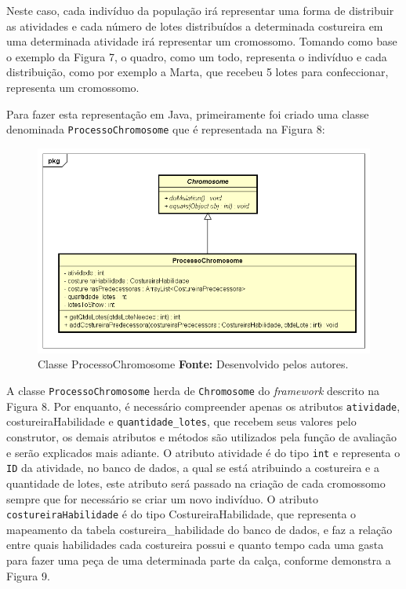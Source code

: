 \par Neste caso, cada indivíduo da população irá representar uma forma de
distribuir as atividades e cada número de lotes distribuídos a determinada
costureira em uma determinada atividade irá representar um cromossomo. 
Tomando como base o exemplo da Figura 7, o quadro, como um todo, representa 
o indivíduo e cada distribuição, como por exemplo a Marta, que recebeu 5 
lotes para confeccionar, representa um cromossomo.

\par Para fazer esta representação em Java, primeiramente foi criado uma classe denominada \texttt{ProcessoChromosome} que é
representada na Figura 8:

\begin{figure}[h!]
	\centerline{\includegraphics[scale=0.6]{./imagens/processo_chromosome_diagram.png}}
	\caption[Classe ProcessoChromosome]
	{Classe ProcessoChromosome \textbf{Fonte:} Desenvolvido pelos autores.}
	\label{fig:exemplo1}
\end{figure}


\par A classe \texttt{ProcessoChromosome} herda de \texttt{Chromosome} do
\textit{framework} descrito na Figura 8. Por enquanto, é necessário compreender
apenas os atributos \texttt{atividade}, costureiraHabilidade e
\texttt{quantidade\_lotes}, que recebem seus valores pelo construtor, os
demais atributos e métodos são utilizados pela função de avaliação e serão explicados mais adiante. 
O atributo atividade é do tipo \texttt{int} e representa o \texttt{ID} da
atividade, no banco de dados, a qual se está atribuindo a costureira e a
quantidade de lotes, este atributo será passado na criação de cada cromossomo
sempre que for necessário se criar um novo indivíduo. O atributo \texttt{costureiraHabilidade} é do tipo CostureiraHabilidade, que representa o
mapeamento da tabela costureira\_habilidade do banco de dados, e faz a relação
entre quais habilidades cada costureira possui e quanto tempo cada uma gasta para fazer uma peça de 
uma determinada parte da calça, conforme demonstra a Figura 9.

